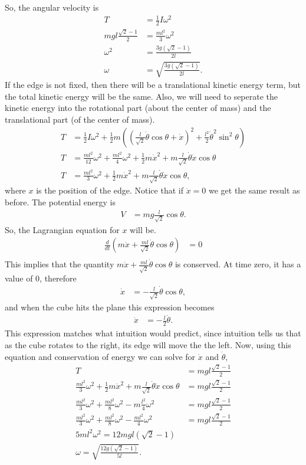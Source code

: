 \documentclass[10pt]{article}
\begin{document}
So, the angular velocity is
\begin{align*}
  T &= \frac{1}{2}I\omega^2\\
  mgl\frac{\sqrt{2}-1}{2} &= \frac{ml^2}{3}\omega^2\\
  \omega^2 &= \frac{3g(\sqrt{2}-1)}{2l}\\
  \omega &= \sqrt{\frac{3g(\sqrt{2}-1)}{2l}}.
\end{align*}
If the edge is not fixed, then there will be a translational kinetic energy 
term, but the total kinetic energy will be the same. Also, we will need to 
seperate the kinetic energy into the rotational part (about the center of
mass) and the translational part (of the center of mass).
\begin{align*}
  T &= \frac{1}{2}I\omega^2 + \frac{1}{2}m\left( \left( \frac{l}{\sqrt{2}}\dot\theta\cos\theta+\dot x \right)^2+\frac{l^2}{2}\dot\theta^2\sin^2\theta \right)\\
  T &= \frac{ml^2}{12}\omega^2 + \frac{ml^2}{4}\omega^2 + \frac{1}{2}m\dot x^2 + m\frac{l}{\sqrt{2}}\dot\theta\dot x\cos\theta\\
  T &= \frac{ml^2}{3}\omega^2 + \frac{1}{2}m\dot x^2 + m\frac{l}{\sqrt{2}}\dot\theta\dot x\cos\theta,
\end{align*}
where $x$ is the position of the edge. Notice that if $\dot x=0$ we get the
same result as before.  The potential energy is
\begin{align*}
  V &= mg\frac{l}{\sqrt{2}}\cos\theta.
\end{align*}
So, the Lagrangian equation for $x$ will be.
\begin{align*}
  \frac{d}{dt}\left( m\dot x + \frac{ml}{\sqrt{2}}\dot\theta\cos\theta \right) &= 0\\
\end{align*}
This implies that the quantity $m\dot x + \frac{ml}{\sqrt{2}}\dot\theta\cos\theta$
is conserved.  At time zero, it has a value of 0, therefore
\begin{align*}
  \dot x &= -\frac{l}{\sqrt{2}}\dot\theta\cos\theta,
\end{align*}
and when the cube hits the plane this expression becomes
\begin{align*}
  \dot x &= -\frac{l}{2}\dot\theta.
\end{align*}
This expression matches what intuition would predict, since intuition tells us
that as the cube rotates to the right, its edge will move the the left.
Now, using this equation and conservation of energy we can solve for $\dot x$
and $\dot\theta$,
\begin{align*}
  T &= mgl\frac{\sqrt{2}-1}{2}\\
  \frac{ml^2}{3}\omega^2 + \frac{1}{2}m\dot x^2 + m\frac{l}{\sqrt{2}}\dot\theta\dot x\cos\theta &= mgl\frac{\sqrt{2}-1}{2}\\
  \frac{ml^2}{3}\omega^2 + \frac{ml^2}{8}\omega^2 - m\frac{l^2}{4}\omega^2 &= mgl\frac{\sqrt{2}-1}{2}\\
  \frac{ml^2}{3}\omega^2 + \frac{ml^2}{8}\omega^2 - \frac{ml^2}{4}\omega^2 &= mgl\frac{\sqrt{2}-1}{2}\\
  5ml^2\omega^2 = 12mgl(\sqrt{2}-1)\\
  \omega = \sqrt{\frac{12g(\sqrt{2}-1)}{5l}}.
\end{align*}
\end{document}
